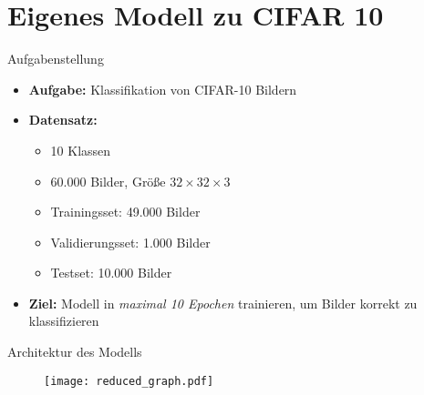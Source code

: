 \section{Eigenes Modell zu CIFAR 10}


\begin{frame}{Aufgabenstellung}
    \begin{itemize}
        \item \textbf{Aufgabe:} Klassifikation von CIFAR-10 Bildern
        \item \textbf{Datensatz:}
            \begin{itemize}
                \item 10 Klassen
                \item 60.000 Bilder, Größe $32\times32\times3$
                \item Trainingsset: 49.000 Bilder
                \item Validierungsset: 1.000 Bilder
                \item Testset: 10.000 Bilder
            \end{itemize}
        \item \textbf{Ziel:} Modell in \emph{maximal 10 Epochen} trainieren, um Bilder korrekt zu klassifizieren
    \end{itemize}
\end{frame}




\begin{frame}{Architektur des Modells}
    \begin{figure}
        \centering
        \texttt{[image: reduced\_graph.pdf]}
    \end{figure}

\end{frame}


